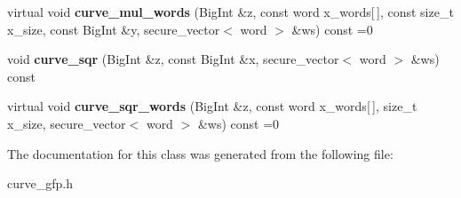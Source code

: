 \begin{DoxyCompactItemize}
virtual void {\bfseries curve\+\_\+mul\+\_\+words} (Big\+Int \&z, const word x\+\_\+words\mbox{[}$\,$\mbox{]}, const size\+\_\+t x\+\_\+size, const Big\+Int \&y, secure\+\_\+vector$<$ word $>$ \&ws) const =0
\item 
\mbox{\label{class_botan_1_1_curve_g_fp___repr_a9b652bfeb9dda232ef0f8836964a319c}} 
void {\bfseries curve\+\_\+sqr} (Big\+Int \&z, const Big\+Int \&x, secure\+\_\+vector$<$ word $>$ \&ws) const
\item 
\mbox{\label{class_botan_1_1_curve_g_fp___repr_a78d34766a7ffbf3593591f3c15827d45}} 
virtual void {\bfseries curve\+\_\+sqr\+\_\+words} (Big\+Int \&z, const word x\+\_\+words\mbox{[}$\,$\mbox{]}, size\+\_\+t x\+\_\+size, secure\+\_\+vector$<$ word $>$ \&ws) const =0
\end{DoxyCompactItemize}


The documentation for this class was generated from the following file\+:\begin{DoxyCompactItemize}
\item 
curve\+\_\+gfp.\+h\end{DoxyCompactItemize}
